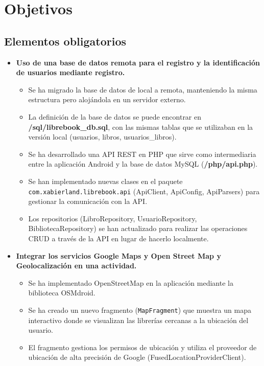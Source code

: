 \documentclass[a4paper,11pt]{report}
\begin{document}
  \chapter{Objetivos}
    \section{Elementos obligatorios}
      \begin{itemize}
        \item \textbf{Uso de una base de datos remota para el registro y la identificación de usuarios mediante registro.}
          \begin{itemize}
            \item Se ha migrado la base de datos de local a remota, manteniendo la misma estructura pero alojándola en un servidor externo.
            \item La definición de la base de datos se puede encontrar en \textbf{/sql/librebook\_db.sql}, con las mismas tablas que se utilizaban en la versión local (usuarios, libros, usuarios\_libros).
            \item Se ha desarrollado una API REST en PHP que sirve como intermediaria entre la aplicación Android y la base de datos MySQL (\textbf{/php/api.php}).
            \item Se han implementado nuevas clases en el paquete \texttt{com.xabierland.librebook.api} (ApiClient, ApiConfig, ApiParsers) para gestionar la comunicación con la API.
            \item Los repositorios (LibroRepository, UsuarioRepository, BibliotecaRepository) se han actualizado para realizar las operaciones CRUD a través de la API en lugar de hacerlo localmente.
          \end{itemize} 
        \item \textbf{Integrar los servicios Google Maps y Open Street Map y Geolocalización en una actividad.}
          \begin{itemize}
            \item Se ha implementado OpenStreetMap en la aplicación mediante la biblioteca OSMdroid.
            \item Se ha creado un nuevo fragmento (\texttt{MapFragment}) que muestra un mapa interactivo donde se visualizan las librerías cercanas a la ubicación del usuario.
            \item El fragmento gestiona los permisos de ubicación y utiliza el proveedor de ubicación de alta precisión de Google (FusedLocationProviderClient).

\end{itemize}
\end{itemize}
\end{document}
